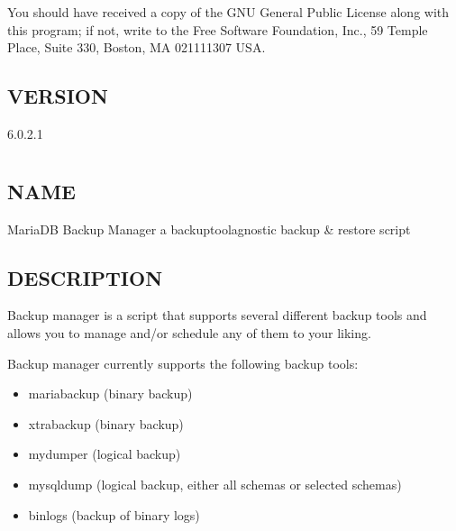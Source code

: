 \documentclass[letterpaper,10pt,english]{sphinxmanual}
\begin{document}
You should have received a copy of the GNU General Public License along with
this program; if not, write to the Free Software Foundation, Inc., 59 Temple
Place, Suite 330, Boston, MA  02111\sphinxhyphen{}1307  USA.


\section{VERSION}
\label{\detokenize{mariadb-archiver:version}}
 6.0.2.1


\chapter{}
\label{\detokenize{mariadb-backup-manager:mariadb-backup-manager}}\label{\detokenize{mariadb-backup-manager::doc}}

\section{NAME}
\label{\detokenize{mariadb-backup-manager:name}}
MariaDB Backup Manager \sphinxhyphen{} a backup\sphinxhyphen{}tool\sphinxhyphen{}agnostic backup \& restore script


\section{DESCRIPTION}
\label{\detokenize{mariadb-backup-manager:description}}
Backup manager is a script that supports several different backup tools and
allows you to manage and/or schedule any of them to your liking.

Backup manager currently supports the following backup tools:
\begin{itemize}
\item {} 
mariabackup (binary backup)

\item {} 
xtrabackup (binary backup)

\item {} 
mydumper (logical backup)

\item {} 
mysqldump (logical backup, either all schemas or selected schemas)

\item {} 
binlogs (backup of binary logs)

\end{itemize}
\end{document}
